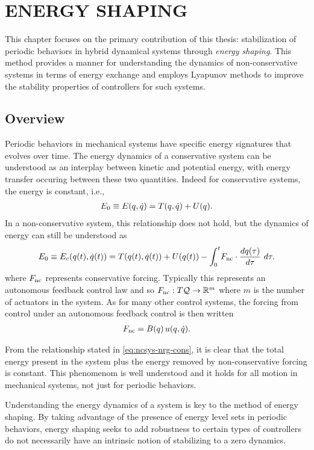 \chapter{\uppercase{Energy Shaping}}

This chapter focuses on the primary contribution of this thesis: stabilization of periodic behaviors in hybrid dynamical systems through {\em energy shaping}.
%
This method provides a manner for understanding the dynamics of non-conservative systems in terms of energy exchange and employs Lyapunov methods to improve the stability properties of controllers for such systems.
%

\section{Overview}

Periodic behaviors in mechanical systems have specific energy signatures that evolves over time.
%
The energy dynamics of a conservative system can be understood as an interplay between kinetic and potential energy, with energy transfer occuring between these two quantities.
%
Indeed for conservative systems, the energy is constant, i.e.,
\begin{align}
  E_{0} \equiv E(q, \dot{q}) = T(q, \dot{q}) + U(q).
\end{align}
%
In a non-conservative system, this relationship does not hold, but the dynamics of energy can still be understood as
\begin{align}
  \label{eq:ncsys-nrg-cons}
  E_{0} \equiv E_{c}(q(t), \dot{q}(t)) = T(q(t), \dot{q}(t)) + U(q(t)) - \int_{0}^{t} \! F_{\mathrm{nc}} \cdot \frac{dq(\tau)}{d\tau} \ d\tau.
\end{align}
where $F_{\mathrm{nc}}$ represents conservative forcing. Typically this represents an autonomous feedback control law and so $F_{\mathrm{nc}} : T\mathcal{Q} \to \mathbb{R}^m$ where $m$ is the number of actuators in the system.
%
As for many other control systems, the forcing from control under an autonomous feedback control is then written
\begin{align}
  F_{\mathrm{nc}} = B(q) \, u(q, \dot{q}).
\end{align}

From the relationship stated in \eqref{eq:ncsys-nrg-cons}, it is clear that the total energy present in the system plus the energy removed by non-conservative forcing is constant.
%
This phenomenom is well understood and it holds for all motion in mechanical systems, not just for periodic behaviors.

Understanding the energy dynamics of a system is key to the method of energy shaping.
%
By taking advantage of the presence of energy level sets in periodic behaviors, energy shaping seeks to add robustness to certain types of controllers do not necessarily have an intrinsic notion of stabilizing to a zero dynamics.
%


